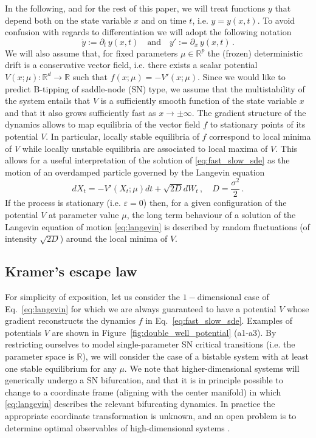 \documentclass[a4paper,fleqn]{cas-sc}
\newcommand{\fref}[1]{Figure~\ref{#1}}
\begin{document}
In the following, and for the rest of this paper, we will treat functions $y$ that depend both on the state variable $x$ and on time $t$, i.e. $y=y(x,t)$.
To avoid confusion with regards to differentiation we will adopt the following notation
%
\begin{equation*}
        \dot{y}:=\partial_t\,y(x,t)\quad \text{and}\quad y':=\partial_x\,y(x,t)\,.
\end{equation*}
%
We will also assume that, for fixed parameters $\mu\in \mathbb{R}^{p}$ the (frozen) deterministic drift is a conservative vector field, i.e. there exists a scalar potential $V(x;\mu):\mathbb{R}^{d}\to \mathbb{R}$ such that $f(x;\mu) = -V'(x;\mu)$.
Since we would like to predict B-tipping of saddle-node (SN) type, we assume that the multistability of the system entails that $V$ is a sufficiently smooth function of the state variable $x$ and that it also grows sufficiently fast as $x\to\pm\infty$.
The gradient structure of the dynamics allows to map equilibria of the vector field $f$ to stationary points of its potential $V$.
In particular, locally stable equilibria of $f$ correspond to local minima of $V$ while locally unstable equilibria are associated to local maxima of $V$.
This allows for a useful interpretation of the solution of \eqref{eq:fast_slow_sde} as the motion of an overdamped particle governed by the Langevin equation
%
\begin{equation}\label{eq:langevin}
        dX_{t} = -V'(X_{t};\mu)dt + \sqrt{2D}dW_{t}\,,\quad D=\frac{\sigma^{2}}{2}\,.
\end{equation}
%
If the process is stationary (i.e. $\varepsilon=0$) then, for a given configuration of the potential $V$ at parameter value $\mu$, the long term behaviour of a solution of the Langevin equation of motion \eqref{eq:langevin} is described by random fluctuations (of intensity $\sqrt{2D}$) around the local minima of $V$.
%
\subsection{Kramer's escape law}\label{subsec:kramer_escape_formula}
For simplicity of exposition, let us consider the $1-$dimensional case of Eq.~\eqref{eq:langevin} for which we are always guaranteed to have a potential $V$ whose gradient reconstructs the dynamics $f$ in Eq.~\eqref{eq:fast_slow_sde}.
Examples of potentials $V$ are shown in \fref{fig:double_well_potential} (a1-a3).
By restricting ourselves to model single-parameter SN critical transitions (i.e. the parameter space is $\mathbb{R}$), we will consider the case of a bistable system with at least one stable equilibrium for any $\mu$.
We note that higher-dimensional systems will generically undergo a SN bifurcation, and that it is in principle possible to change to a coordinate frame (aligning with the center manifold) in which \eqref{eq:langevin} describes the relevant bifurcating dynamics. 
In practice the appropriate coordinate transformation is unknown, and an open problem is to determine optimal observables of high-dimensional systems \cite{Lohmann2025b}.
\end{document}
